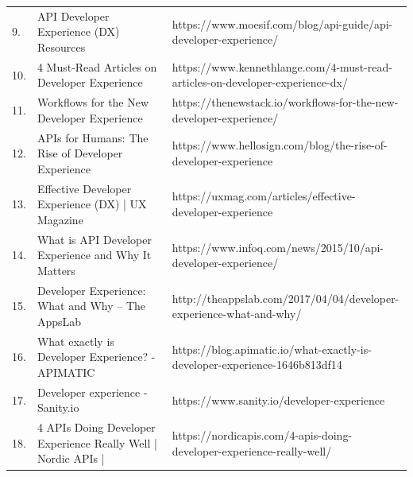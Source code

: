 \documentclass[english, 12pt, a4paper, sci, utf8, a-1b, online]{aaltothesis}
\begin{document}
\begin{center}
\begin{longtable}{p{0.05\linewidth}p{0.35\linewidth}p{0.60\linewidth}}
    9.  & API Developer Experience (DX) Resources                         & https://www.moesif.com/blog/api-guide/api-developer-experience/                                                          \\
    10. & 4 Must-Read Articles on Developer Experience                    & https://www.kennethlange.com/4-must-read-articles-on-developer-experience-dx/                                            \\
    11. & Workflows for the New Developer Experience                      & https://thenewstack.io/workflows-for-the-new-developer-experience/                                                       \\
    12. & APIs for Humans: The Rise of Developer Experience               & https://www.hellosign.com/blog/the-rise-of-developer-experience                                                          \\
    13. & Effective Developer Experience (DX) | UX Magazine               & https://uxmag.com/articles/effective-developer-experience                                                                \\
    14. & What is API Developer Experience and Why It Matters             & https://www.infoq.com/news/2015/10/api-developer-experience/                                                             \\
    15. & Developer Experience: What and Why – The AppsLab                & http://theappslab.com/2017/04/04/developer-experience-what-and-why/                                                      \\
    16. & What exactly is Developer Experience? - APIMATIC                & https://blog.apimatic.io/what-exactly-is-developer-experience-1646b813df14                                               \\
    17. & Developer experience - Sanity.io                                & https://www.sanity.io/developer-experience                                                                               \\
    18. & 4 APIs Doing Developer Experience Really Well | Nordic APIs |   & https://nordicapis.com/4-apis-doing-developer-experience-really-well/
  \end{longtable}
\end{center}
\end{document}
